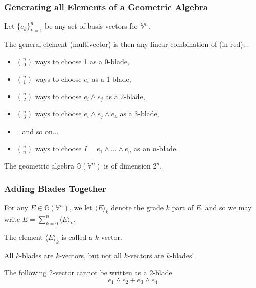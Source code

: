 \documentclass{beamer}
\newcommand{\G}{\mathbb{G}}
\newcommand{\V}{\mathbb{V}}
\begin{document}
\begin{frame}
\frametitle{Generating all Elements of a Geometric Algebra}
Let $\{e_k\}_{k=1}^n$ be any set of basis vectors for $\V^n$.\pause

The general element (multivector) is then any linear combination of (\alert{in red})...\pause
\begin{itemize}
\item $\binom{n}{0}$ ways to choose \alert{1} as a 0-blade,\pause
\item $\binom{n}{1}$ ways to choose \alert{$e_i$} as a 1-blade,\pause
\item $\binom{n}{2}$ ways to choose \alert{$e_i\wedge e_j$} as a 2-blade,\pause
\item $\binom{n}{3}$ ways to choose \alert{$e_i\wedge e_j\wedge e_k$} as a 3-blade,\pause
\item ...and so on...\pause
\item $\binom{n}{n}$ ways to choose \alert{$I=e_1\wedge\dots\wedge e_n$} as an $n$-blade.\pause
\end{itemize}
The geometric algebra $\G(\V^n)$ is of dimension $2^n$.
\end{frame}

\begin{frame}
\frametitle{Adding Blades Together}
\begin{definition}
For any $E\in\G(\V^n)$, we let $\langle E\rangle_k$ denote the grade $k$ part of $E$,
and so we may write $E = \sum_{k=0}^n\langle E\rangle_k$.
\end{definition}\pause
The element $\langle E\rangle_k$ is called a $k$-vector.\pause

All $k$-blades are $k$-vectors, but not all $k$-vectors are $k$-blades!\pause
\begin{example}
The following 2-vector cannot be written as a 2-blade.
\begin{equation*}
e_1\wedge e_2 + e_3\wedge e_4
\end{equation*}
\end{example}
\end{frame}

\end{document}
